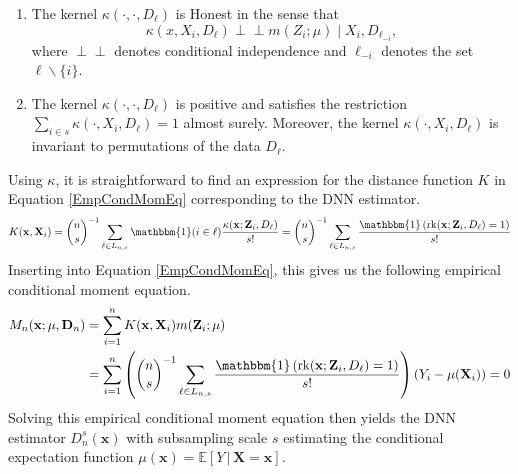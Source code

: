 \documentclass[letterpaper,10pt]{article}
\numberwithin{equation}{section}
\numberwithin{theorem}{section}
\theoremstyle{definition}
\newcommand{\1}{\mathbb{1}}
\newcommand{\indep}{\perp\!\!\!\!\perp}
\begin{document}
\vspace{0.5cm}
\begin{definition}\label{Symmetry_Honesty}
	\begin{enumerate}
		\item The kernel $\kappa\left(\cdot, \cdot, D_{\ell}\right)$ is Honest in the sense that
		      $$\kappa\left(x, X_i, D_{\ell}\right) \indep m\left(Z_i ; \mu\right) \mid X_i, D_{\ell_{-i}},$$
		      where $\indep$ denotes conditional independence and $\ell_{-i}$ denotes the set $\ell \backslash\{i\}$.
		\item The kernel $\kappa\left(\cdot, \cdot, D_{\ell}\right)$ is positive and satisfies the restriction
		      $\sum_{i \in s} \kappa\left(\cdot, X_i, D_{\ell}\right)=1$ almost surely.
		      Moreover, the kernel $\kappa\left(\cdot, X_i, D_{\ell}\right)$ is invariant to permutations of the data $D_{\ell}.$
	\end{enumerate}
\end{definition}
Using $\kappa$, it is straightforward to find an expression for the distance function $K$ in Equation \ref{EmpCondMomEq} corresponding to the DNN estimator.
\begin{equation}
	K(\mathbf{x}, \mathbf{X}_i)
	= \binom{n}{s}^{-1} \sum_{\ell \in L_{n,s}} \mathbbm{1}(i \in \ell)\frac{\kappa(\mathbf{x}; \mathbf{Z}_i, D_{\ell})}{s!}
	= \binom{n}{s}^{-1} \sum_{\ell \in L_{n,s}} \frac{\mathbbm{1}\left(\operatorname{rk}(\mathbf{x}; \mathbf{Z}_i, D_{\ell}) = 1\right)}{s!}
\end{equation}
Inserting into Equation \ref{EmpCondMomEq}, this gives us the following empirical conditional moment equation.
\begin{equation}
	\begin{aligned}
		M_n(\mathbf{x}; \mu, \mathbf{D}_n)
		 & = \sum_{i = 1}^{n}K(\mathbf{x}, \mathbf{X}_i)m(\mathbf{Z}_i; \mu)                                                                                                                                         \\
		 & = \sum_{i = 1}^{n}\left(\binom{n}{s}^{-1} \sum_{\ell \in L_{n,s}} \frac{\mathbbm{1}\left(\operatorname{rk}(\mathbf{x}; \mathbf{Z}_i, D_{\ell}) = 1\right)}{s!}\right)\left(Y_i - \mu(\mathbf{X}_i)\right)
		= 0
	\end{aligned}
\end{equation}
Solving this empirical conditional moment equation then yields the DNN estimator $D_{n}^{s}(\mathbf{x})$ with subsampling scale $s$ estimating the conditional expectation function $\mu(\mathbf{x}) = \mathbb{E}\left[Y \, | \, \mathbf{X} = \mathbf{x}\right]$.
\end{document}

